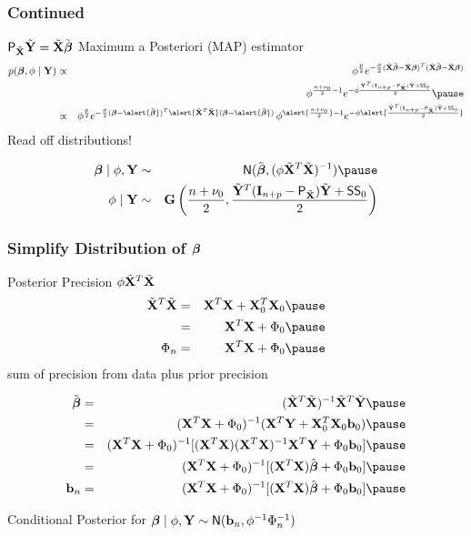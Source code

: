 \documentclass[handout]{beamer}\usepackage[]{graphicx}\usepackage[]{color}
\begin{document}
\begin{frame}
  \frametitle{Continued}
$\textsf{P}_{\tilde{\mathbf{X}}} \tilde{\mathbf{Y}} = \tilde{\mathbf{X}} \tilde{\boldsymbol{\beta}}$  Maximum a Posteriori (MAP) estimator
\begin{eqnarray*}
 p(\b, \phi \mid \Y)
 &\propto&   \phi^{\frac {p}{ 2}} e^{- \frac{\phi} {2}
(\tX\tb - \tX \b)^T (\tX\tb - \tX \b)}\\
& & \phi^{\frac{n + \nu_0}{2} - 1} e^{-  \phi \frac{ \tY^T (\I_{n +p}
  -\P_{\tX}) \tY +  \SS_0}{ 2}} \pause \\
&\propto&   \phi^{\frac {p}{ 2}} e^{- \frac{\phi} {2}
(\b - \alert{\tb})^T \alert{\tX^T\tX}(\b - \alert{\tb})} \,
 \phi^{\alert{\frac{n + \nu_0}{2}} - 1} e^{-  \phi \alert{ \frac{ \tY^T (\I_{n +p}
  -\P_{\tX}) \tY +  \SS_0}{ 2}}}
  \end{eqnarray*}
Read off distributions!

\begin{eqnarray*}
  \b \mid \phi, \Y & \sim & \N( \tb, (\phi \tX^T \tX)^{-1}) \pause \\
  \phi \mid \Y & \sim & \G\left(\frac{n + \nu_0}{2},  \frac{\tY^T (\I_{n +p}
  -\P_{\tX}) \tY +  \SS_0}{ 2} \right)
\end{eqnarray*}
\end{frame}
\begin{frame}
  \frametitle{Simplify Distribution of $\boldsymbol{\beta}$}

Posterior Precision $\phi \tilde{\mathbf{X}}^T\tilde{\mathbf{X}}$ \pause
  \begin{eqnarray*}
\tX^T\tX &= &\X^T\X + \X_0^T\X_0 \pause \\
         & = &\X^T\X + \Phi_0 \pause \\
\Phi_n & = & \X^T\X + \Phi_0 \pause
\end{eqnarray*}
sum of precision from data plus prior precision \pause

\begin{eqnarray*}
  \tb & = &  (\tX^T\tX)^{-1} \tX^T\tY \pause \\
 & = &  (\X^T\X + \Phi_0)^{-1} (\X^T\Y + \X_0^T \X_0 \bv_0) \pause \\
 & = &  (\X^T\X + \Phi_0)^{-1}[ (\X^T\X) (\X^T\X)^{-1} \X^T\Y + \Phi_0
 \bv_0] \pause \\
& = & (\X^T\X + \Phi_0)^{-1}[ (\X^T\X) \bhat + \Phi_0
 \bv_0] \pause \\
\bv_n & = & (\X^T\X + \Phi_0)^{-1}[ (\X^T\X) \bhat + \Phi_0
 \bv_0]  \pause
\end{eqnarray*}

Conditional Posterior for $\boldsymbol{\beta} \mid \phi, \mathbf{Y}  \sim  \textsf{N}( \mathbf{b}_n, \phi^{-1} \Phi_n^{-1})$

\end{frame}
\end{document}
